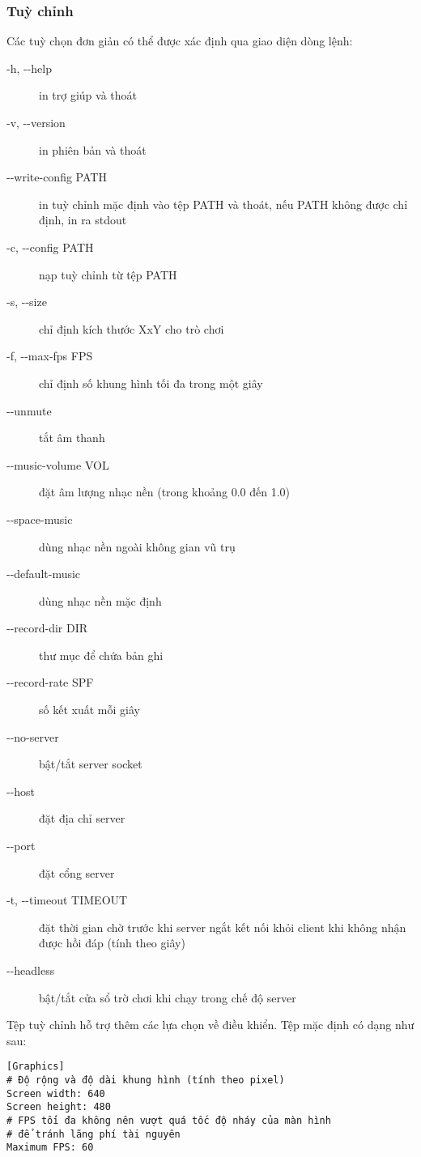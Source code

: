 \documentclass[a4paper,12pt]{article}
\begin{document}
\subsubsection{Tuỳ chỉnh}
\label{config}
Các tuỳ chọn đơn giản có thể được xác định qua giao diện dòng lệnh:
\begin{description}
  \item[-h, -{}-help] in trợ giúp và thoát
  \item[-v, -{}-version] in phiên bản và thoát
  \item[-{}-write-config \lbrack PATH\rbrack ] in tuỳ chỉnh mặc định vào tệp
    PATH và thoát, nếu PATH không được chỉ định, in ra stdout
  \item[-c, -{}-config PATH] nạp tuỳ chỉnh từ tệp PATH
  \item[-s, -{}-size] chỉ định kích thước XxY cho trò chơi
  \item[-f, -{}-max-fps FPS] chỉ định số khung hình tối đa trong một giây
  \item[-{}-\lbrack un\rbrack mute] tắt âm thanh
  \item[-{}-music-volume VOL] đặt âm lượng nhạc nền (trong khoảng 0.0 đến 1.0)
  \item[-{}-space-music] dùng nhạc nền ngoài không gian vũ trụ
  \item[-{}-default-music] dùng nhạc nền mặc định
  \item[-{}-record-dir DIR] thư mục để chứa bản ghi
  \item[-{}-record-rate SPF] số kết xuất mỗi giây
  \item[-{}-\lbrack no-\rbrack server] bật/tắt server socket
  \item[-{}-host] đặt địa chỉ server
  \item[-{}-port] đặt cổng server
  \item[-t, -{}-timeout TIMEOUT] đặt thời gian chờ trước khi server ngắt kết nối
    khỏi client khi không nhận được hồi đáp (tính theo giây)
  \item[-{}-head\lbrack less\rbrack] bật/tắt cửa sổ trờ chơi khi chạy trong chế
    độ server
\end{description}

Tệp tuỳ chỉnh hỗ trợ thêm các lựa chọn về điều khiển. Tệp mặc định có dạng như
sau:
\begin{verbatim}
[Graphics]
# Độ rộng và độ dài khung hình (tính theo pixel)
Screen width: 640
Screen height: 480
# FPS tối đa không nên vượt quá tốc độ nháy của màn hình
# để tránh lãng phí tài nguyên
Maximum FPS: 60
\end{verbatim}
\end{document}
